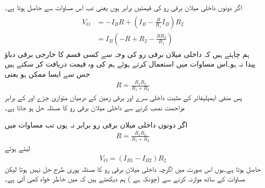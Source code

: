 اگر دونوں داخلی میلان برقی رو کی قیمتیں برابر ہوں یعنی  تب اس مساوات سے حاصل ہوتا ہے۔
\begin{gather}
\begin{aligned}
 V_O&=-I_B R + \left (I_B-\frac{R}{R_1}I_B \right ) R_2\\
&=I_B \left (-R+R_2-\frac{R R_2}{R_1} \right ) 
\end{aligned}
\end{gather}
ہم چاہتے ہیں کہ داخلی میلان برقی رو کی وجہ سے کسی قسم کا خارجی برقی دباؤ پیدا نہ ہو۔اس مساوات میں  استعمال کرتے ہوئے ہم  کی وہ قیمت دریافت کر سکتے ہیں جس سے ایسا ممکن ہو یعنی
\begin{align}
R=\frac{R_1 R_2}{R_1+R_2}
\end{align}
پس منفی ایمپلیفائر کے مثبت داخلی سرے  اور برقی زمین کے درمیان متوازی جڑے  اور  کے برابر مزاحمت نصب کرنے سے داخلی  میلان برقی رو کا مسئلہ حل ہو جاتا ہے۔

اگر دونوں داخلی میلان برقی رو برابر نہ ہوں تب مساوات   میں 
\begin{align*}
R=\frac{R_1 R_2}{R_1+R_2}
\end{align*}
لیتے ہوئے
\begin{align}
V_O=\left (I_{B1}-I_{B2} \right )R_2
\end{align}
حاصل ہوتا ہے۔یوں اس صورت میں اگرچہ داخلی میلان برقی رو کا مسئلہ پوری طرح حل نہیں ہوتا لیکن مساوات   کے ساتھ موازنہ کرنے سے (چونکہ  ہے ) ہم دیکھتے ہیں کہ   میں خاطر خواہ کمی آتی ہے۔



